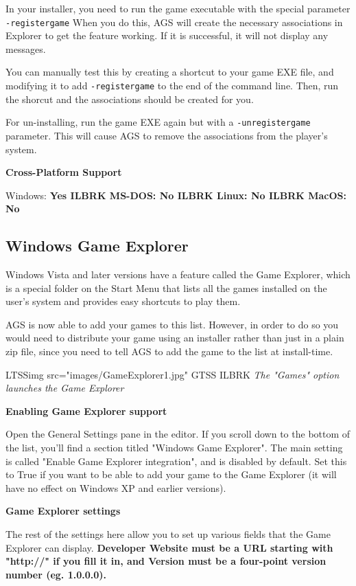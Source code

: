 In your installer, you need to run the game executable with the special
parameter \verb$-registergame$  When you do this, AGS will create the necessary
associations in Explorer to get the feature working. If it is successful, it will
not display any messages.

You can manually test this by creating a shortcut to your game EXE file, and modifying
it to add \verb$-registergame$ to the end of the command line. Then, run the shorcut
and the associations should be created for you.

For un-installing, run the game EXE again but with a  \verb$-unregistergame$  parameter.
This will cause AGS to remove the associations from the player's system.

\bf{Cross-Platform Support}

Windows: \bf{ Yes }ILBRK
MS-DOS: \bf{ No }ILBRK
Linux: \bf{ No }ILBRK
MacOS: \bf{ No }


\subsection{Windows Game Explorer}\label{GameExplorer}%

Windows Vista and later versions have a feature called the Game Explorer, which is a special folder on
the Start Menu that lists all the games installed on the user's system and provides
easy shortcuts to play them.

AGS is now able to add your games to this list. However, in order to do so you
would need to distribute your game using an installer rather than just in a plain
zip file, since you need to tell AGS to add the game to the list at install-time.

LTSSimg src="images/GameExplorer1.jpg" GTSS ILBRK
\it{The "Games" option launches the Game Explorer}

\bf{Enabling Game Explorer support}

Open the General Settings pane in the editor. If you scroll down to the bottom of the
list, you'll find a section titled "Windows Game Explorer". The main setting
is called "Enable Game Explorer integration", and is disabled by default. Set this
to True if you want to be able to add your game to the Game Explorer (it will
have no effect on Windows XP and earlier versions).

\bf{Game Explorer settings}

The rest of the settings here allow you to set up various fields that the Game Explorer
can display. \bf{Developer Website} must be a URL starting with "http://" if you fill
it in, and \bf{Version} must be a four-point version number (eg. 1.0.0.0).

